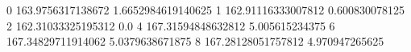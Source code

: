 0 163.9756317138672 1.6652984619140625
1 162.91116333007812 0.600830078125
2 162.31033325195312 0.0
4 167.31594848632812 5.005615234375
6 167.34829711914062 5.0379638671875
8 167.28128051757812 4.970947265625
